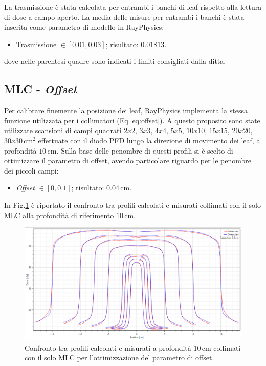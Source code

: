 La trasmissione è stata calcolata per entrambi i banchi di leaf rispetto alla lettura di dose a campo aperto. La media delle misure per entrambi i banchi è stata inserita come parametro di modello in RayPhysics:
\begin{itemize}
\item Trasmissione $\in [0.01,0.03]$; risultato: $0.01813$.
\end{itemize}
dove nelle parentesi quadre sono indicati i limiti consigliati dalla ditta.


\subsection{MLC - \textit{Offset}}
Per calibrare finemente la posizione dei leaf, RayPhysics implementa la stessa funzione utilizzata per i collimatori (Eq.\ref{eq:offset}). A questo proposito sono state utilizzate scansioni di campi quadrati $2x2$, $3x3$, $4x4$, $5x5$, $10x10$, $15x15$, $20x20$, $30x30\,$cm$^2$ effettuate con il diodo PFD lungo la direzione di movimento dei leaf, a profondità $10\,$cm. Sulla base delle penombre di questi profili si è scelto di ottimizzare il parametro di offset, avendo particolare riguardo per le penombre dei piccoli campi:
\begin{itemize}
\item \textit{Offset} $\in [0,0.1]$; risultato: $0.04\,$cm.
\end{itemize}
In Fig.\ref{fig:MLC_Offset} è riportato il confronto tra profili calcolati e misurati collimati con il solo MLC alla profondità di riferimento $10\,$cm.
\begin{figure}
\centering
\includegraphics[width=\textwidth]{./cap2/MLC_Offset.png}
\caption{Confronto tra profili calcolati e misurati a profondità $10\,$cm collimati con il solo MLC per l'ottimizzazione del parametro di offset.}
\label{fig:MLC_Offset}
\end{figure}

